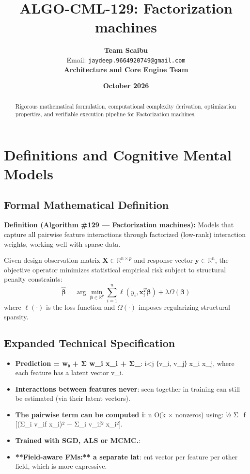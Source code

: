 \documentclass[11pt,a4paper]{article}
\title{\textbf{ALGO-CML-129: Factorization machines}}
\author{\textbf{Team Scaibu} \\ \small Email: \texttt{jaydeep.9664920749@gmail.com} \\ \small \textbf{Architecture and Core Engine Team}}
\date{\textbf{October 2026}}
\theoremstyle{definition}
\begin{document}
\maketitle

\begin{abstract}
Rigorous mathematical formulation, computational complexity derivation, optimization properties, and verifiable execution pipeline for Factorization machines.
\end{abstract}

\section{Definitions and Cognitive Mental Models}

\subsection{Formal Mathematical Definition}
\textbf{Definition (Algorithm \#129 --- Factorization machines):}
Models that capture all pairwise feature interactions through factorized (low-rank) interaction weights, working well with sparse data.

Given design observation matrix $\mathbf{X} \in \mathbb{R}^{n \times p}$ and response vector $\mathbf{y} \in \mathbb{R}^n$, the objective operator minimizes statistical empirical risk subject to structural penalty constraints:
\begin{equation}
\hat{\boldsymbol{\beta}} = \arg\min_{\boldsymbol{\beta} \in \mathbb{R}^p} \sum_{i=1}^n \ell(y_i, \mathbf{x}_i^T \boldsymbol{\beta}) + \lambda \Omega(\boldsymbol{\beta})
\end{equation}
where $\ell(\cdot)$ is the loss function and $\Omega(\cdot)$ imposes regularizing structural sparsity.

\subsection{Expanded Technical Specification}
\begin{itemize}
\item \textbf{Prediction = w₀ + Σ w\_i x\_i + Σ\_}: {i<j} ⟨v\_i, v\_j⟩ x\_i x\_j, where each feature has a latent vector v\_i.
\item \textbf{Interactions between features never}:  seen together in training can still be estimated (via their latent vectors).
\item \textbf{The pairwise term can be computed i}: n O(k × nonzeros) using: ½ Σ\_f [(Σ\_i v\_if x\_i)² − Σ\_i v\_if² x\_i²].
\item \textbf{Trained with SGD, ALS or MCMC.}: 
\item \textbf{**Field-aware FMs:** a separate lat}: ent vector per feature per other field, which is more expressive.
\end{itemize}
\end{document}
